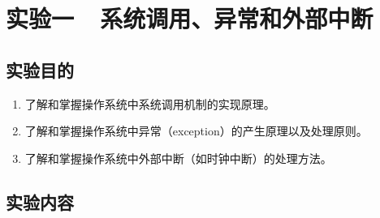\section{实验一\ \ 系统调用、异常和外部中断}




\subsection{实验目的}
\begin{enumerate}
    \item 了解和掌握操作系统中系统调用机制的实现原理。
    \item 了解和掌握操作系统中异常（exception）的产生原理以及处理原则。
    \item 了解和掌握操作系统中外部中断（如时钟中断）的处理方法。
\end{enumerate}

\subsection{实验内容}

